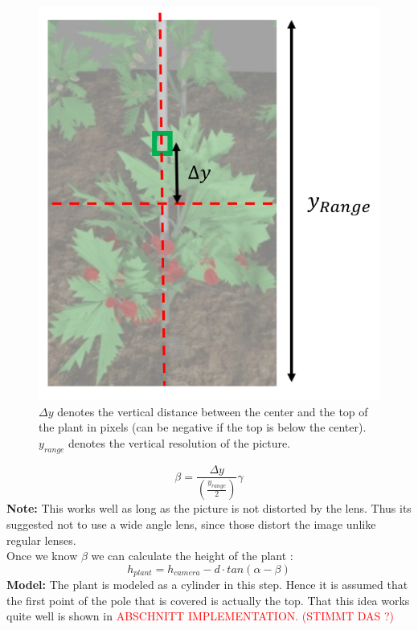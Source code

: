    \begin{figure}[H]
       \centering
       \includegraphics[scale=0.6]{getTopAngle.PNG}
       \caption{$\Delta y$ denotes the vertical distance between the center and the top of the plant in pixels (can be negative if the top is below the center). $y_{range}$ denotes the vertical resolution of the picture.}
       \label{fig:getTopAngle}
   \end{figure}
$$\beta = \frac{\Delta y}{(\frac{y_{range}}{2})}\gamma$$
\textbf{Note:} This works well as long as the picture is not distorted by the lens. Thus its suggested not to use a wide angle lens, since those distort the image unlike regular lenses.\\
Once we know $\beta$ we can calculate the height of the plant :
$$h_{plant} = h_{camera} - d\cdot tan(\alpha - \beta)$$
\textbf{Model:} The plant is modeled as a cylinder in this step. Hence it is assumed that the first point of the pole that is covered is actually the top. That this idea works quite well is shown in \textcolor{red}{ABSCHNITT IMPLEMENTATION. (STIMMT DAS ?)}
